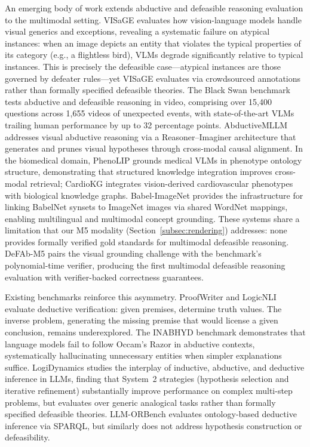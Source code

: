 \documentclass{article}
\theoremstyle{definition}
\begin{document}
An emerging body of work extends abductive and defeasible reasoning evaluation to the multimodal setting. VISaGE \cite{park2025visage} evaluates how vision-language models handle visual generics and exceptions, revealing a systematic failure on atypical instances: when an image depicts an entity that violates the typical properties of its category (e.g., a flightless bird), VLMs degrade significantly relative to typical instances. This is precisely the defeasible case---atypical instances are those governed by defeater rules---yet VISaGE evaluates via crowdsourced annotations rather than formally specified defeasible theories. The Black Swan benchmark \cite{chinchure2025blackswan} tests abductive and defeasible reasoning in video, comprising over 15,400 questions across 1,655 videos of unexpected events, with state-of-the-art VLMs trailing human performance by up to 32 percentage points. AbductiveMLLM \cite{chang2026abductivemllm} addresses visual abductive reasoning via a Reasoner--Imaginer architecture that generates and prunes visual hypotheses through cross-modal causal alignment. In the biomedical domain, PhenoLIP \cite{liu2026phenolip} grounds medical VLMs in phenotype ontology structure, demonstrating that structured knowledge integration improves cross-modal retrieval; CardioKG \cite{rjoob2026cardiokg} integrates vision-derived cardiovascular phenotypes with biological knowledge graphs. Babel-ImageNet \cite{geigle2024babelimagenet} provides the infrastructure for linking BabelNet synsets to ImageNet images via shared WordNet mappings, enabling multilingual and multimodal concept grounding. These systems share a limitation that our M5 modality (Section~\ref{subsec:rendering}) addresses: none provides formally verified gold standards for multimodal defeasible reasoning. DeFAb-M5 pairs the visual grounding challenge with the benchmark's polynomial-time verifier, producing the first multimodal defeasible reasoning evaluation with verifier-backed correctness guarantees.

Existing benchmarks reinforce this asymmetry. ProofWriter \cite{tafjord2021proofwriter} and LogicNLI \cite{tian2021diagnosing} evaluate deductive verification: given premises, determine truth values. The inverse problem, generating the missing premise that would license a given conclusion, remains underexplored. The INABHYD benchmark \cite{inabhyd2025} demonstrates that language models fail to follow Occam's Razor in abductive contexts, systematically hallucinating unnecessary entities when simpler explanations suffice. LogiDynamics \cite{zheng2025logidynamics} studies the interplay of inductive, abductive, and deductive inference in LLMs, finding that System~2 strategies (hypothesis selection and iterative refinement) substantially improve performance on complex multi-step problems, but evaluates over generic analogical tasks rather than formally specified defeasible theories. LLM-ORBench \cite{llmorbench2026} evaluates ontology-based deductive inference via SPARQL, but similarly does not address hypothesis construction or defeasibility.
\end{document}

